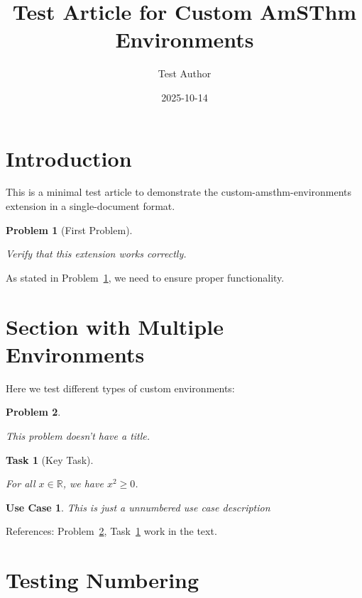 \documentclass[
]{article}
\title{Test Article for Custom AmSThm Environments}
\author{Test Author}
\date{2025-10-14}
\newtheorem{task}{Task}
\newtheorem*{use case}{Use Case}
\newtheorem{problem}{Problem}[section]
\theoremstyle{definition}
\theoremstyle{plain}
\theoremstyle{remark}
\begin{document}
\maketitle


\section{Introduction}\label{introduction}

This is a minimal test article to demonstrate the
custom-amsthm-environments extension in a single-document format.

\begin{problem}[First Problem]\label{prm-first}

Verify that this extension works correctly.

\end{problem}

As stated in Problem~\ref{prm-first}, we need to ensure proper
functionality.

\section{Section with Multiple
Environments}\label{section-with-multiple-environments}

Here we test different types of custom environments:

\begin{problem}\label{prm-second}

This problem doesn't have a title.

\end{problem}

\begin{task}[Key Task]\label{tsk-key}

For all \(x \in \mathbb{R}\), we have \(x^2 \geq 0\).

\end{task}

\begin{use case}

This is just a unnumbered use case description

\end{use case}

References: Problem~\ref{prm-second}, Task~\ref{tsk-key} work in the
text.

\section{Testing Numbering}\label{testing-numbering}
\end{document}
